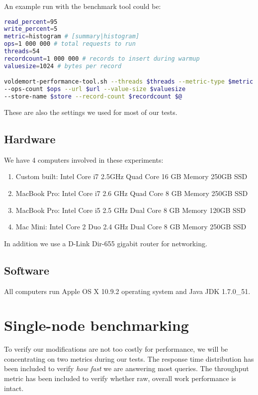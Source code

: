 An example run with the benchmark tool could be:
\begin{lstlisting}[language=bash]
read_percent=95
write_percent=5
metric=histogram # [summary|histogram]
ops=1 000 000 # total requests to run
threads=54
recordcount=1 000 000 # records to insert during warmup
valuesize=1024 # bytes per record

voldemort-performance-tool.sh --threads $threads --metric-type $metric 
--ops-count $ops --url $url --value-size $valuesize 
--store-name $store --record-count $recordcount $@
\end{lstlisting}

These are also the settings we used for most of our tests.

\subsection{Hardware}
We have 4 computers involved in these experiments:

\begin{enumerate}
	\item Custom built: Intel Core i7 2.5GHz Quad Core  16 GB Memory 250GB SSD
	\item MacBook Pro: Intel Core i7 2.6 GHz Quad Core 8 GB Memory 250GB SSD
	\item MacBook Pro: Intel Core i5 2.5 GHz Dual Core 8 GB Memory 120GB SSD
	\item Mac Mini: Intel Core 2 Duo 2.4 GHz Dual Core 8 GB Memory 250GB SSD
\end{enumerate}

In addition we use a D-Link Dir-655 gigabit router for networking.

\subsection{Software}
All computers run Apple OS X 10.9.2 operating system and Java JDK 1.7.0\_51. 

\section{Single-node benchmarking}
To verify our modifications are not too costly for performance, we will be concentrating on two metrics during our tests. The response time distribution has been included to verify \emph{how fast} we are answering most queries. The throughput metric has been included to verify whether raw, overall work performance is intact.

